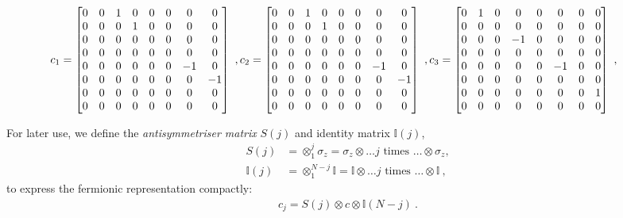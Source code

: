 \begin{equation*}\begin{aligned}
	\hspace*{-25pt}c_1 = \begin{bmatrix}
0 & 0 & 1 & 0 & 0 & 0 &  0 &  0 \\
0 & 0 & 0 & 1 & 0 & 0 &  0 &  0 \\
0 & 0 & 0 & 0 & 0 & 0 &  0 &  0 \\
0 & 0 & 0 & 0 & 0 & 0 &  0 &  0 \\
0 & 0 & 0 & 0 & 0 & 0 & -1 &  0 \\
0 & 0 & 0 & 0 & 0 & 0 &  0 & -1 \\
0 & 0 & 0 & 0 & 0 & 0 &  0 &  0 \\
0 & 0 & 0 & 0 & 0 & 0 &  0 &  0 
\end{bmatrix}~,
	c_2 = \begin{bmatrix}
0 & 0 & 1 & 0 & 0 & 0 &  0 &  0 \\
 0 & 0 & 0 & 1 & 0 & 0 &  0 &  0 \\
 0 & 0 & 0 & 0 & 0 & 0 &  0 &  0 \\
 0 & 0 & 0 & 0 & 0 & 0 &  0 &  0 \\
 0 & 0 & 0 & 0 & 0 & 0 & -1 &  0 \\
 0 & 0 & 0 & 0 & 0 & 0 &  0 & -1 \\
 0 & 0 & 0 & 0 & 0 & 0 &  0 &  0 \\
 0 & 0 & 0 & 0 & 0 & 0 &  0 &  0 
\end{bmatrix}~,
		c_3 = \begin{bmatrix}
	0 & 1 & 0 &  0 & 0 &  0 & 0 & 0 \\
	0 & 0 & 0 &  0 & 0 &  0 & 0 & 0 \\
	0 & 0 & 0 & -1 & 0 &  0 & 0 & 0 \\
	0 & 0 & 0 &  0 & 0 &  0 & 0 & 0 \\
	0 & 0 & 0 &  0 & 0 & -1 & 0 & 0 \\
	0 & 0 & 0 &  0 & 0 &  0 & 0 & 0 \\
	0 & 0 & 0 &  0 & 0 &  0 & 0 & 1 \\
	0 & 0 & 0 &  0 & 0 &  0 & 0 & 0 
\end{bmatrix}~,\\
\end{aligned}\end{equation*}

For later use, we define the {\it antisymmetriser matrix} \(S(j)\) and identity matrix \(\mathbb{I}(j)\),
\begin{equation}\begin{aligned}
	S(j) &= \otimes_1^j \sigma_z = \sigma_z \otimes \ldots j\text{ times } \ldots \otimes \sigma_z,\\
	\mathbb{I}(j) &= \otimes_1^{N-j} \mathbb{I} = \mathbb{I} \otimes  \ldots j\text{ times } \ldots \otimes \mathbb{I}~,
\end{aligned}\end{equation}
to express the fermionic representation compactly:
\begin{equation}\begin{aligned}\label{jordanwigner}
	c_j = S(j) \otimes c \otimes \mathbb{I}(N-j)~.
\end{aligned}\end{equation}


